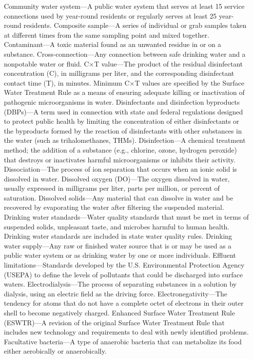 \documentclass{article}
\begin{document}
Community water system---A public water system that serves at least 15
service connections used by year-round residents or regularly serves at
least 25 year-round residents. Composite sample---A series of individual
or grab samples taken at different times from the same sampling point
and mixed together. Contaminant---A toxic material found as an unwanted
residue in or on a substance. Cross-connection---Any connection between
safe drinking water and a nonpotable water or fluid. C×T value---The
product of the residual disinfectant concentration (C), in milligrams
per liter, and the corresponding disinfectant contact time (T), in
minutes. Minimum C×T values are specified by the Surface Water Treatment
Rule as a means of ensuring adequate killing or inactivation of
pathogenic microorganisms in water. Disinfectants and disinfection
byproducts (DBPs)---A term used in connection with state and federal
regulations designed to protect public health by limiting the
concentration of either disinfectants or the byproducts formed by the
reaction of disinfectants with other substances in the water (such as
trihalomethanes, THMs). Disinfection---A chemical treatment method; the
addition of a substance (e.g., chlorine, ozone, hydrogen peroxide) that
destroys or inactivates harmful microorganisms or inhibits their
activity. Dissociation---The process of ion separation that occurs when
an ionic solid is dissolved in water. Dissolved oxygen (DO)---The oxygen
dissolved in water, usually expressed in milligrams per liter, parts per
million, or percent of saturation. Dissolved solids---Any material that
can dissolve in water and be recovered by evaporating the water after
filtering the suspended material. Drinking water standards---Water
quality standards that must be met in terms of suspended solids,
unpleasant taste, and microbes harmful to human health. Drinking water
standards are included in state water quality rules. Drinking water
supply---Any raw or finished water source that is or may be used as a
public water system or as drinking water by one or more individuals.
Effluent limitations---Standards developed by the U.S. Environmental
Protection Agency (USEPA) to define the levels of pollutants that could
be discharged into surface waters. Electrodialysis---The process of
separating substances in a solution by dialysis, using an electric field
as the driving force. Electronegativity---The tendency for atoms that do
not have a complete octet of electrons in their outer shell to become
negatively charged. Enhanced Surface Water Treatment Rule (ESWTR)---A
revision of the original Surface Water Treatment Rule that includes new
technology and requirements to deal with newly identified problems.
Facultative bacteria---A type of anaerobic bacteria that can metabolize
its food either aerobically or anaerobically.
\end{document}
